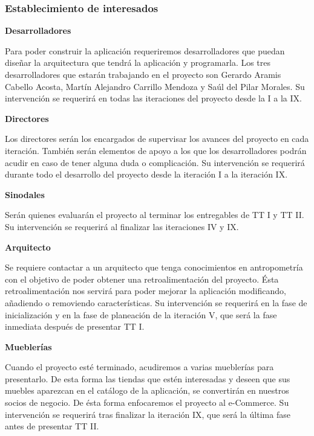 \subsubsection{Establecimiento de interesados}
\textbf{Desarrolladores} \par
Para poder construir la aplicación requeriremos desarrolladores que puedan diseñar la arquitectura que tendrá la aplicación y programarla. Los tres desarrolladores que estarán trabajando en el proyecto son Gerardo Aramis Cabello Acosta, Martín Alejandro Carrillo Mendoza y Saúl del Pilar Morales. Su intervención se requerirá en todas las iteraciones del proyecto desde la I a la IX.\par
\textbf{Directores} \par
Los directores serán los encargados de supervisar los avances del proyecto en cada iteración. También serán elementos de apoyo a los que los desarrolladores podrán acudir en caso de tener alguna duda o complicación. Su intervención se requerirá durante todo el desarrollo del proyecto desde la iteración I a la iteración IX.\par
\textbf{Sinodales} \par
Serán quienes evaluarán el proyecto al terminar los entregables de TT I y TT II. Su intervención se requerirá al finalizar las iteraciones IV y IX.\par
\textbf{Arquitecto} \par
Se requiere contactar a un arquitecto que tenga conocimientos en antropometría con el objetivo de poder obtener una retroalimentación del proyecto. Ésta retroalimentación nos servirá para poder mejorar la aplicación modificando, añadiendo o removiendo características. Su intervención se requerirá en la fase de inicialización y en la fase de planeación de la iteración V, que será la fase inmediata después de presentar TT I.\par
\textbf{Mueblerías} \par
Cuando el proyecto esté terminado, acudiremos a varias mueblerías para presentarlo. De esta forma las tiendas que estén interesadas y deseen que sus muebles aparezcan en el catálogo de la aplicación, se convertirán en nuestros socios de negocio. De ésta forma enfocaremos el proyecto al e-Commerce. Su intervención se requerirá tras finalizar la iteración IX, que será la última fase antes de presentar TT II.\par

